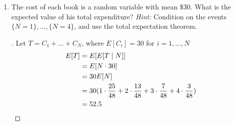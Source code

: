 \documentclass[paper=usletter, fontsize=12pt]{article}
\begin{document}
\begin{enumerate}[label=\textbf{\arabic*}.]
\begin{enumerate}[label=(\alph*)]
            \item The cost of each book is a random variable with mean \$30.
            What is the expected value of his total expenditure? \textit{Hint:}
            Condition on the events $\{N=1\},\ldots, \{N=4\}$, and use the
            total expectation theorem.
            \begin{proof}[\unskip\nopunct]
                Let $T=C_1+\ldots + C_N$, where $E[C_i]=30$ for $i = 1, \ldots, N$\\
                \begingroup
                \addtolength{\jot}{1em}
                \begin{align*}
                    E[T] & = E[E[T \mid N]] \\
                    & = E[N \cdot 30] \\
                    & = 30E[N] \\
                    & = 30 (1 \cdot \frac{25}{48} + 2 \cdot \frac{13}{48} + 3 \cdot \frac{7}{48} + 4 \cdot \frac{3}{48}) \\
                    & = 52.5 \qedhere
                \end{align*}
                \endgroup
            \end{proof}
            \vspace{0.2in}

        \end{enumerate}

    \end{enumerate}
\end{document}
